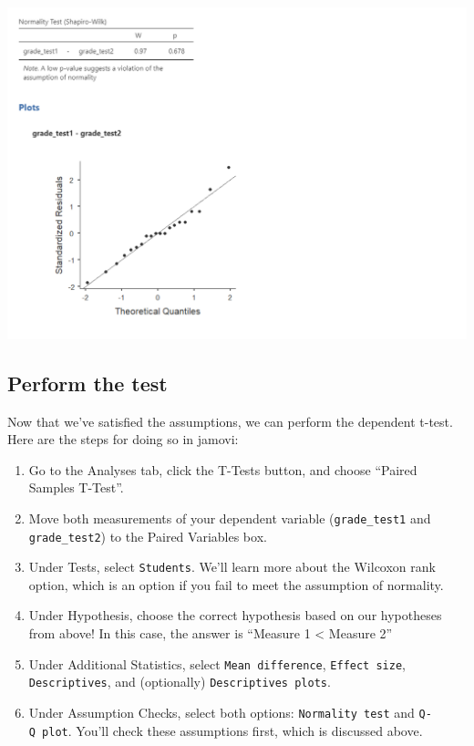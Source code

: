 \documentclass[
]{book}
\begin{document}
\includegraphics{images/03_dependent_t-test/dependent_normality.png}

\hypertarget{perform-the-test-2}{%
\subsection{Perform the test}\label{perform-the-test-2}}

Now that we've satisfied the assumptions, we can perform the dependent t-test. Here are the steps for doing so in jamovi:

\begin{enumerate}
\def\labelenumi{\arabic{enumi}.}
\item
  Go to the Analyses tab, click the T-Tests button, and choose ``Paired Samples T-Test''.
\item
  Move both measurements of your dependent variable (\texttt{grade\_test1} and \texttt{grade\_test2}) to the Paired Variables box.
\item
  Under Tests, select \texttt{Student\textquotesingle{}s}. We'll learn more about the Wilcoxon rank option, which is an option if you fail to meet the assumption of normality.
\item
  Under Hypothesis, choose the correct hypothesis based on our hypotheses from above! In this case, the answer is ``Measure 1 \textless{} Measure 2''
\item
  Under Additional Statistics, select \texttt{Mean\ difference}, \texttt{Effect\ size}, \texttt{Descriptives}, and (optionally) \texttt{Descriptives\ plots}.
\item
  Under Assumption Checks, select both options: \texttt{Normality\ test} and \texttt{Q-Q\ plot}. You'll check these assumptions first, which is discussed above.
\end{enumerate}
\end{document}
